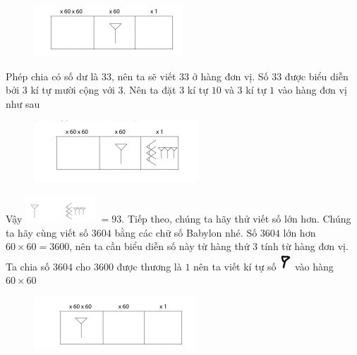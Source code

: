	\begin{figure}[H]
		\centering
		\vspace*{-5pt}
		\captionsetup{labelformat= empty, justification=centering}
		\includegraphics[width=0.4\linewidth]{21}
		\vspace*{-10pt}
	\end{figure}
	Phép chia có số dư là $33$, nên ta sẽ viết $33$ ở hàng đơn vị. Số $33$ được biểu diễn bởi $3$ kí tự mười cộng với $3$. Nên ta đặt $3$ kí tự $10$ và $3$ kí tự $1$ vào hàng đơn vị như sau
	\begin{figure}[H]
		\centering
		\vspace*{-5pt}
		\captionsetup{labelformat= empty, justification=centering}
		\includegraphics[width=0.4\linewidth]{22}
		\vspace*{-10pt}
	\end{figure}
	Vậy \includegraphics{23}  $= 93$.
	\vskip 0.1cm
	Tiếp theo, chúng ta hãy thử viết số lớn hơn. Chúng ta hãy cùng viết số $3604$ bằng các chữ số Babylon nhé. Số $3604$ lớn hơn $60\times 60=3600$, nên ta cần biểu diễn số này từ hàng thứ $3$ tính từ hàng đơn vị. Ta chia số $3604$ cho $3600$ được thương là $1$ nên ta viết kí tự số \includegraphics{15}  vào hàng $60\times60$
	\begin{figure}[H]
		\centering
		\vspace*{-5pt}
		\captionsetup{labelformat= empty, justification=centering}
		\includegraphics[width=0.4\linewidth]{25}
		\vspace*{-10pt}
	\end{figure}
